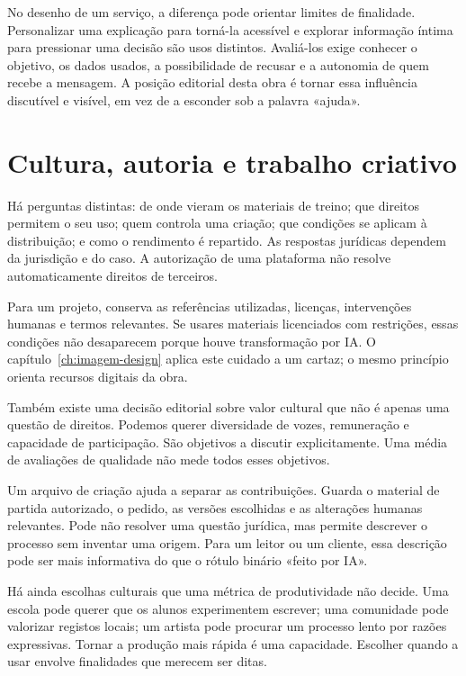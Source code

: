 No desenho de um serviço, a diferença pode orientar limites de finalidade. Personalizar uma explicação para torná-la acessível e explorar informação íntima para pressionar uma decisão são usos distintos. Avaliá-los exige conhecer o objetivo, os dados usados, a possibilidade de recusar e a autonomia de quem recebe a mensagem. A posição editorial desta obra é tornar essa influência discutível e visível, em vez de a esconder sob a palavra «ajuda».

\section{Cultura, autoria e trabalho criativo}
Há perguntas distintas: de onde vieram os materiais de treino; que direitos permitem o seu uso; quem controla uma criação; que condições se aplicam à distribuição; e como o rendimento é repartido. As respostas jurídicas dependem da jurisdição e do caso. A autorização de uma plataforma não resolve automaticamente direitos de terceiros.

Para um projeto, conserva as referências utilizadas, licenças, intervenções humanas e termos relevantes. Se usares materiais licenciados com restrições, essas condições não desaparecem porque houve transformação por IA. O capítulo~\ref{ch:imagem-design} aplica este cuidado a um cartaz; o mesmo princípio orienta recursos digitais da obra.

Também existe uma decisão editorial sobre valor cultural que não é apenas uma questão de direitos. Podemos querer diversidade de vozes, remuneração e capacidade de participação. São objetivos a discutir explicitamente. Uma média de avaliações de qualidade não mede todos esses objetivos.

Um arquivo de criação ajuda a separar as contribuições. Guarda o material de partida autorizado, o pedido, as versões escolhidas e as alterações humanas relevantes. Pode não resolver uma questão jurídica, mas permite descrever o processo sem inventar uma origem. Para um leitor ou um cliente, essa descrição pode ser mais informativa do que o rótulo binário «feito por IA».

Há ainda escolhas culturais que uma métrica de produtividade não decide. Uma escola pode querer que os alunos experimentem escrever; uma comunidade pode valorizar registos locais; um artista pode procurar um processo lento por razões expressivas. Tornar a produção mais rápida é uma capacidade. Escolher quando a usar envolve finalidades que merecem ser ditas.

